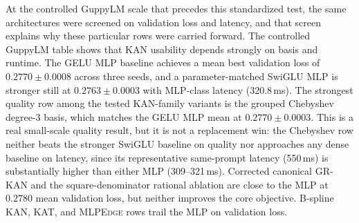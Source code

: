 \documentclass{article}
\newcommand{\modelname}[1]{\textsc{#1}}
\newcommand{\grkan}{\modelname{GR-KAN}}
\newcommand{\mlpedge}{\modelname{MLPEdge}}
\begin{document}
At the controlled GuppyLM scale that precedes this standardized test, the same architectures were screened on validation loss and latency, and that screen explains why these particular rows were carried forward. The controlled GuppyLM table shows that KAN usability depends strongly on basis and runtime. The GELU MLP baseline achieves a mean best validation loss of \(0.2770\pm0.0008\) across three seeds, and a parameter-matched SwiGLU MLP is stronger still at \(0.2763\pm0.0003\) with MLP-class latency (320.8\,ms). The strongest quality row among the tested KAN-family variants is the grouped Chebyshev degree-3 basis, which matches the GELU MLP mean at \(0.2770\pm0.0003\). This is a real small-scale quality result, but it is not a replacement win: the Chebyshev row neither beats the stronger SwiGLU baseline on quality nor approaches any dense baseline on latency, since its representative same-prompt latency (550\,ms) is substantially higher than either MLP (309--321\,ms). Corrected canonical \grkan{} and the square-denominator rational ablation are close to the MLP at \(0.2780\) mean validation loss, but neither improves the core objective. B-spline KAN, KAT, and \mlpedge{} rows trail the MLP on validation loss.
\end{document}
